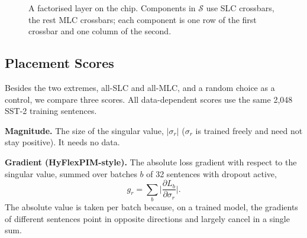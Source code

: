 \begin{figure}[t]
\centering
{}
\caption{A factorised layer on the chip. Components in $\mathcal S$ use SLC crossbars, the rest MLC
crossbars; each component is one row of the first crossbar and one column of the second.}
\label{fig:tiers}
\end{figure}

\subsection{Placement Scores}
Besides the two extremes, all-SLC and all-MLC, and a random choice as a control, we compare three scores.
All data-dependent scores use the same 2{,}048 SST-2 training sentences.

\textbf{Magnitude.} The size of the singular value, $|\sigma_r|$ ($\sigma_r$ is trained freely and need
not stay positive). It needs no data.

\textbf{Gradient (HyFlexPIM-style).} The absolute loss gradient with respect to the singular value,
summed over batches $b$ of 32 sentences with dropout active,
\begin{equation}
g_r=\sum_b\Big|\frac{\partial L_b}{\partial\sigma_r}\Big|.
\label{eq:grad}
\end{equation}
The absolute value is taken per batch because, on a trained model, the gradients of different sentences
point in opposite directions and largely cancel in a single sum.

